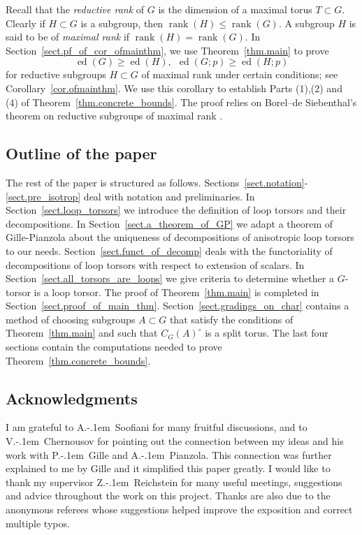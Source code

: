 \documentclass[12pt]{amsart}
\numberwithin{equation}{section}
\theoremstyle{definition}
\newcommand{\ed}{\operatorname{ed}}
\newcommand{\rank}{\operatorname{rank}}
\begin{document}
Recall that the \emph{reductive rank} of $G$ is the dimension of a maximal torus $T\subset G$. Clearly if $H\subset G$ is a subgroup, then $\rank(H)\leq \rank(G)$. A subgroup $H$ is said to be of \emph{maximal rank} if $\rank(H) = \rank(G)$. In Section~\ref{sect.pf_of_cor_ofmainthm}, we use Theorem~\ref{thm.main} to prove 
$$\ed(G)\geq \ed(H), \ \ \ed(G;p)\geq \ed(H;p)$$
for reductive subgroups $H\subset G$ of maximal rank under certain conditions; see Corollary~\ref{cor.ofmainthm}. We use this corollary to establish Parts (1),(2) and (4) of Theorem~\ref{thm.concrete_bounds}.  The proof relies on Borel–de Siebenthal's theorem on reductive subgroups of maximal rank \cite{borel1949sous}.




\subsection{Outline of the paper}
The rest of the paper is structured as follows.
Sections~\ref{sect.notation}-\ref{sect.pre_isotrop} deal with notation and preliminaries. 
In Section~\ref{sect.loop_torsors} we introduce the definition of loop torsors and their decompositions. In Section~\ref{sect.a_theorem_of_GP} we adapt a theorem of Gille-Pianzola about the uniqueness of decompositions of  anisotropic loop torsors to our needs. Section~\ref{sect.funct_of_decomp} deals with the functoriality of decompositions of loop torsors with respect to extension of scalars. In Section~\ref{sect.all_torsors_are_loops} we give criteria to determine whether a $G$-torsor is a loop torsor. The proof of Theorem~\ref{thm.main} is completed in Section~\ref{sect.proof_of_main_thm}. Section~\ref{sect.gradings_on_char} contains a method of choosing subgroups $A\subset G$ that satisfy the conditions of Theorem~\ref{thm.main} and such  that $C_G(A)^{\circ}$ is a split torus. The last four sections contain the computations needed to prove Theorem~\ref{thm.concrete_bounds}.


\subsection{Acknowledgments} I am grateful to A.\kern-.1em\ Soofiani for many fruitful discussions, and to V.\kern-.1em\ Chernousov for pointing out the connection between my ideas and his work with P.\kern-.1em\ Gille and A.\kern-.1em\ Pianzola. This connection was further explained to me by Gille and it simplified this paper greatly.  I would like to thank my supervisor Z.\kern-.1em\ Reichstein for many useful meetings, suggestions and advice throughout the work on this project.  Thanks are also due to the anonymous referees whose
suggestions helped improve the exposition and correct multiple typos. 
\end{document}
